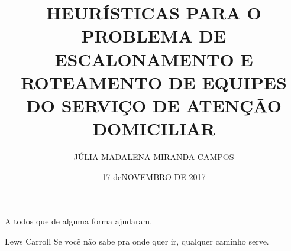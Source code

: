 \documentclass[qual, classic, a4paper]{ufbathesis}
\institute{INSTITUTO DE MATEM\'{A}TICA}
\title{HEURÍSTICAS PARA O PROBLEMA DE  ESCALONAMENTO E ROTEAMENTO DE EQUIPES DO SERVIÇO DE ATEN\c{C}\~AO DOMICILIAR}
\date{17 deNOVEMBRO DE 2017}
\author{JÚLIA MADALENA MIRANDA CAMPOS}
\begin{document}


\frontpage

\frontmatter

\presentationpage






\acknowledgements
A todos que de alguma forma ajudaram.

 \begin{epigraph}[]{Lews Carroll}
  Se voc\^{e} n\~{a}o sabe pra onde quer ir, qualquer caminho serve.
 \end{epigraph}






\listoffigures

\listoftables

\mainmatter
\end{document}
